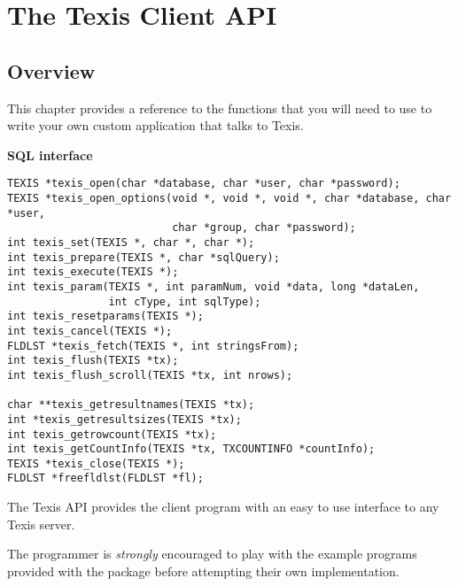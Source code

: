 

\chapter{The Texis Client API}{\label{Part:V:Chp:tcapi}}{\label{Part:V:Chp:Embed}}
\section{Overview}
This chapter provides a reference to the functions that you will need to
use to write your own custom application that talks to Texis.

\SYNOPSIS

{\bf SQL interface}
\begin{verbatim}
TEXIS *texis_open(char *database, char *user, char *password);
TEXIS *texis_open_options(void *, void *, void *, char *database, char *user,
                          char *group, char *password);
int texis_set(TEXIS *, char *, char *);
int texis_prepare(TEXIS *, char *sqlQuery);
int texis_execute(TEXIS *);
int texis_param(TEXIS *, int paramNum, void *data, long *dataLen,
                int cType, int sqlType);
int texis_resetparams(TEXIS *);
int texis_cancel(TEXIS *);
FLDLST *texis_fetch(TEXIS *, int stringsFrom);
int texis_flush(TEXIS *tx);
int texis_flush_scroll(TEXIS *tx, int nrows);

char **texis_getresultnames(TEXIS *tx);
int *texis_getresultsizes(TEXIS *tx);
int texis_getrowcount(TEXIS *tx);
int texis_getCountInfo(TEXIS *tx, TXCOUNTINFO *countInfo);
TEXIS *texis_close(TEXIS *);
FLDLST *freefldlst(FLDLST *fl);

\end{verbatim}

\DESCRIPTION

The Texis API provides the client program with an easy to use interface to
any Texis server.

The programmer is {\em strongly} encouraged to play with the example
programs provided with the package before attempting their own
implementation.

